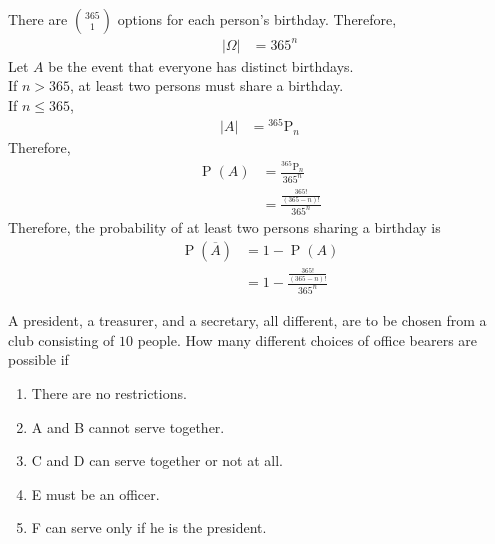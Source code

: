 \documentclass[titlepage, fleqn, a4paper, 12pt, twoside]{article}
\theoremstyle{definition}
\theoremstyle{theorem}
\DeclareMathOperator{\prob}{\mathrm{P}}
\newcommand*{\perm}[2]{{}^{#1}\mathrm{P}_{#2}}%
\begin{document}
\begin{solution}
	There are $\binom{365}{1}$ options for each person's birthday.
	Therefore,
	\begin{align*}
		|\Omega| & = 365^n
	\end{align*}
	Let $A$ be the event that everyone has distinct birthdays.\\
	If $n > 365$, at least two persons must share a birthday.\\
	If $n \le 365$,
	\begin{align*}
		|A| & = \perm{365}{n}
	\end{align*}
	Therefore,
	\begin{align*}
		\prob(A) & = \frac{\perm{365}{n}}{365^n} \\
                         & = \frac{\frac{365!}{(365 - n)!}}{365^n}
	\end{align*}
	Therefore, the probability of at least two persons sharing a birthday is
	\begin{align*}
		\prob\left( \overline{A} \right) & = 1 - \prob(A) \\
                                                 & = 1 - \frac{\frac{365!}{(365 - n)!}}{365^n}
	\end{align*}
\end{solution}

\begin{question}
	A president, a treasurer, and a secretary, all different, are to be chosen from a club consisting of $10$ people.
	How many different choices of office bearers are possible if
	\begin{enumerate}
		\item There are no restrictions.
		\item A and B cannot serve together.
		\item C and D can serve together or not at all.
		\item E must be an officer.
		\item F can serve only if he is the president.
	\end{enumerate}
\end{question}
\end{document}
